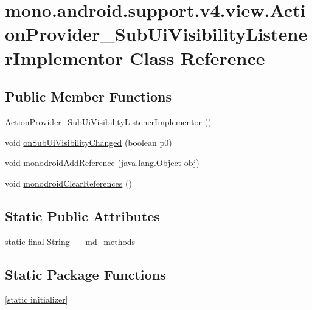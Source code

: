\hypertarget{classmono_1_1android_1_1support_1_1v4_1_1view_1_1_action_provider___sub_ui_visibility_listener_implementor}{
\section{mono.android.support.v4.view.ActionProvider\_\-SubUiVisibilityListenerImplementor Class Reference}
\label{classmono_1_1android_1_1support_1_1v4_1_1view_1_1_action_provider___sub_ui_visibility_listener_implementor}
}
\subsection*{Public Member Functions}
\begin{CompactItemize}
\item 
\hyperlink{classmono_1_1android_1_1support_1_1v4_1_1view_1_1_action_provider___sub_ui_visibility_listener_implementor_3ea6dee8e82881486db5aa98cbcf6fdf}{ActionProvider\_\-SubUiVisibilityListenerImplementor} ()
\item 
void \hyperlink{classmono_1_1android_1_1support_1_1v4_1_1view_1_1_action_provider___sub_ui_visibility_listener_implementor_a16b4664c4316a46993433708b3c1aaa}{onSubUiVisibilityChanged} (boolean p0)
\item 
void \hyperlink{classmono_1_1android_1_1support_1_1v4_1_1view_1_1_action_provider___sub_ui_visibility_listener_implementor_d3bcf21e43259fd4af4b11e26ebea1bb}{monodroidAddReference} (java.lang.Object obj)
\item 
void \hyperlink{classmono_1_1android_1_1support_1_1v4_1_1view_1_1_action_provider___sub_ui_visibility_listener_implementor_ec92bae58c7fb25db74b6fc78f8d9eeb}{monodroidClearReferences} ()
\end{CompactItemize}
\subsection*{Static Public Attributes}
\begin{CompactItemize}
\item 
static final String \hyperlink{classmono_1_1android_1_1support_1_1v4_1_1view_1_1_action_provider___sub_ui_visibility_listener_implementor_80f46f5139a7d5baf9a0c701c053b68d}{\_\-\_\-md\_\-methods}
\end{CompactItemize}
\subsection*{Static Package Functions}
\begin{CompactItemize}
\item 
\hyperlink{classmono_1_1android_1_1support_1_1v4_1_1view_1_1_action_provider___sub_ui_visibility_listener_implementor_bb1b685585d3117cc83de379269cd92e}{\mbox{[}static initializer\mbox{]}}
\end{CompactItemize}

